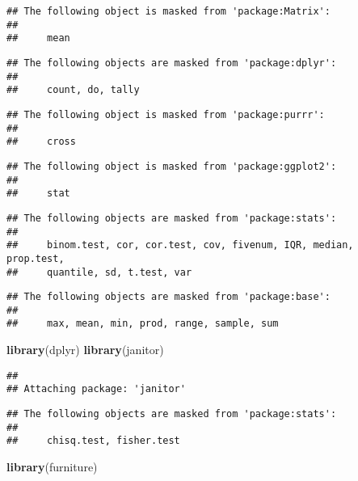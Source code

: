 \documentclass[
]{article}
\newenvironment{Shaded}{\begin{snugshade}}{\end{snugshade}}
\newcommand{\KeywordTok}[1]{\textcolor[rgb]{0.13,0.29,0.53}{\textbf{#1}}}
\newcommand{\NormalTok}[1]{#1}
\begin{document}
\begin{verbatim}
## The following object is masked from 'package:Matrix':
## 
##     mean
\end{verbatim}

\begin{verbatim}
## The following objects are masked from 'package:dplyr':
## 
##     count, do, tally
\end{verbatim}

\begin{verbatim}
## The following object is masked from 'package:purrr':
## 
##     cross
\end{verbatim}

\begin{verbatim}
## The following object is masked from 'package:ggplot2':
## 
##     stat
\end{verbatim}

\begin{verbatim}
## The following objects are masked from 'package:stats':
## 
##     binom.test, cor, cor.test, cov, fivenum, IQR, median, prop.test,
##     quantile, sd, t.test, var
\end{verbatim}

\begin{verbatim}
## The following objects are masked from 'package:base':
## 
##     max, mean, min, prod, range, sample, sum
\end{verbatim}

\begin{Shaded}
\begin{Highlighting}[]
\KeywordTok{library}\NormalTok{(dplyr)}
\KeywordTok{library}\NormalTok{(janitor)}
\end{Highlighting}
\end{Shaded}

\begin{verbatim}
## 
## Attaching package: 'janitor'
\end{verbatim}

\begin{verbatim}
## The following objects are masked from 'package:stats':
## 
##     chisq.test, fisher.test
\end{verbatim}

\begin{Shaded}
\begin{Highlighting}[]
\KeywordTok{library}\NormalTok{(furniture)}
\end{Highlighting}
\end{Shaded}
\end{document}
